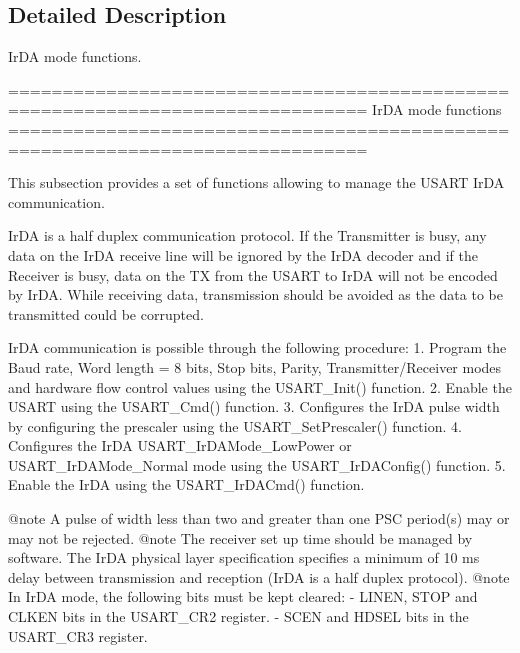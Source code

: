 \subsection{Detailed Description}
Ir\-D\-A mode functions. \begin{DoxyVerb} ===============================================================================
                                IrDA mode functions
 ===============================================================================  

  This subsection provides a set of functions allowing to manage the USART 
  IrDA communication.
  
  IrDA is a half duplex communication protocol. If the Transmitter is busy, any data
  on the IrDA receive line will be ignored by the IrDA decoder and if the Receiver 
  is busy, data on the TX from the USART to IrDA will not be encoded by IrDA.
  While receiving data, transmission should be avoided as the data to be transmitted
  could be corrupted.

  IrDA communication is possible through the following procedure:
     1. Program the Baud rate, Word length = 8 bits, Stop bits, Parity, Transmitter/Receiver 
        modes and hardware flow control values using the USART_Init() function.
     2. Enable the USART using the USART_Cmd() function.
     3. Configures the IrDA pulse width by configuring the prescaler using  
        the USART_SetPrescaler() function.
     4. Configures the IrDA  USART_IrDAMode_LowPower or USART_IrDAMode_Normal mode
        using the USART_IrDAConfig() function.
     5. Enable the IrDA using the USART_IrDACmd() function.

@note A pulse of width less than two and greater than one PSC period(s) may or may
      not be rejected.
@note The receiver set up time should be managed by software. The IrDA physical layer
      specification specifies a minimum of 10 ms delay between transmission and 
      reception (IrDA is a half duplex protocol).
@note In IrDA mode, the following bits must be kept cleared:
        - LINEN, STOP and CLKEN bits in the USART_CR2 register.
        - SCEN and HDSEL bits in the USART_CR3 register.\end{DoxyVerb}
 

